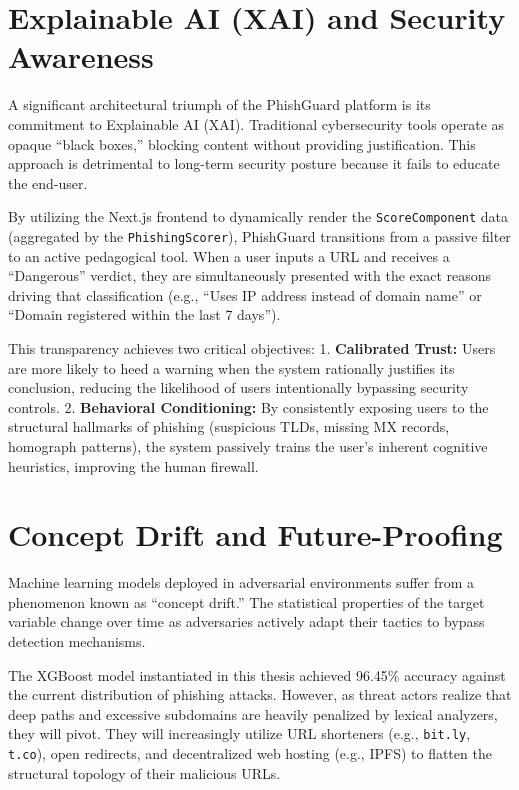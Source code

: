 \section{Explainable AI (XAI) and Security
Awareness}\label{explainable-ai-xai-and-security-awareness}

A significant architectural triumph of the PhishGuard platform is its
commitment to Explainable AI (XAI). Traditional cybersecurity tools
operate as opaque ``black boxes,'' blocking content without providing
justification. This approach is detrimental to long-term security
posture because it fails to educate the end-user.

By utilizing the Next.js frontend to dynamically render the
\texttt{ScoreComponent} data (aggregated by the
\texttt{PhishingScorer}), PhishGuard transitions from a passive filter
to an active pedagogical tool. When a user inputs a URL and receives a
``Dangerous'' verdict, they are simultaneously presented with the exact
reasons driving that classification (e.g., ``Uses IP address instead of
domain name'' or ``Domain registered within the last 7 days'').

This transparency achieves two critical objectives: 1.
\textbf{Calibrated Trust:} Users are more likely to heed a warning when
the system rationally justifies its conclusion, reducing the likelihood
of users intentionally bypassing security controls. 2.
\textbf{Behavioral Conditioning:} By consistently exposing users to the
structural hallmarks of phishing (suspicious TLDs, missing MX records,
homograph patterns), the system passively trains the user's inherent
cognitive heuristics, improving the human firewall.

\section{Concept Drift and
Future-Proofing}\label{concept-drift-and-future-proofing}

Machine learning models deployed in adversarial environments suffer from
a phenomenon known as ``concept drift.'' The statistical properties of
the target variable change over time as adversaries actively adapt their
tactics to bypass detection mechanisms.

The XGBoost model instantiated in this thesis achieved 96.45\% accuracy
against the current distribution of phishing attacks. However, as threat
actors realize that deep paths and excessive subdomains are heavily
penalized by lexical analyzers, they will pivot. They will increasingly
utilize URL shorteners (e.g., \texttt{bit.ly}, \texttt{t.co}), open
redirects, and decentralized web hosting (e.g., IPFS) to flatten the
structural topology of their malicious URLs.

